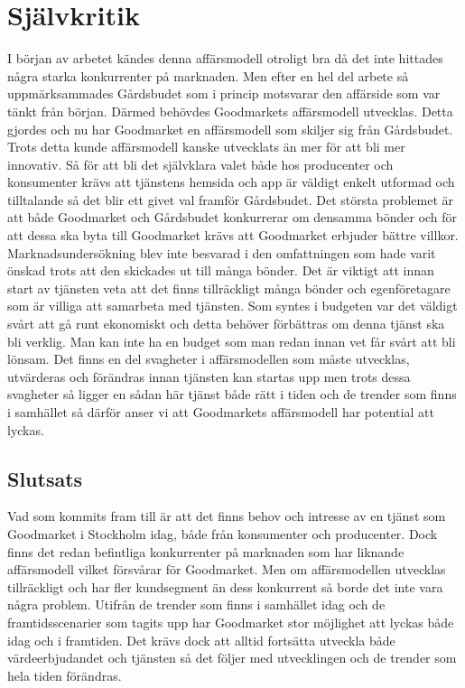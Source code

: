 \documentclass[10pt,a4paper,oneside]{article}
\begin{document}
\newpage

\section{Självkritik}
I början av arbetet kändes denna affärsmodell otroligt bra då det inte hittades några starka konkurrenter på marknaden. Men efter en hel del arbete så uppmärksammades Gårdsbudet som i princip motsvarar den affärside som var tänkt från början. Därmed behövdes Goodmarkets affärsmodell utvecklas. Detta gjordes och nu har Goodmarket en affärsmodell som skiljer sig från Gårdsbudet. Trots detta kunde affärsmodell kanske utvecklats än mer för att bli mer innovativ. Så för att bli det självklara valet både hos producenter och konsumenter krävs att tjänstens hemsida och app är väldigt enkelt utformad och tilltalande så det blir ett givet val framför Gårdsbudet. Det största problemet är att både Goodmarket och Gårdsbudet konkurrerar om densamma bönder och för att dessa ska byta till Goodmarket krävs att Goodmarket erbjuder bättre villkor. Marknadsundersökning blev inte besvarad i den omfattningen som hade varit önskad trots att den skickades ut till många bönder. Det är viktigt att innan start av tjänsten veta att det finns tillräckligt många bönder och egenföretagare som är villiga att samarbeta med tjänsten. Som syntes i budgeten var det väldigt svårt att gå runt ekonomiskt och detta behöver förbättras om denna tjänst ska bli verklig. Man kan inte ha en budget som man redan innan vet får svårt att bli lönsam. Det finns en del svagheter i affärsmodellen som måste utvecklas, utvärderas och förändras innan tjänsten kan startas upp men trots dessa svagheter så ligger en sådan här tjänst både rätt i tiden och de trender som finns i samhället så därför anser vi att Goodmarkets affärsmodell har potential att lyckas. 

\subsection{Slutsats}
Vad som kommits fram till är att det finns behov och intresse av en tjänst som Goodmarket i Stockholm idag, både från konsumenter och producenter. Dock finns det redan befintliga konkurrenter på marknaden som har liknande affärsmodell vilket försvårar för Goodmarket. Men om affärsmodellen utvecklas tillräckligt och har fler kundsegment än dess konkurrent så borde det inte vara några problem. Utifrån de trender som finns i samhället idag och de framtidsscenarier som tagits upp har Goodmarket stor möjlighet att lyckas både idag och i framtiden. Det krävs dock att alltid fortsätta utveckla både värdeerbjudandet och tjänsten så det följer med utvecklingen och de trender som hela tiden förändras. 
\newpage
\end{document}

